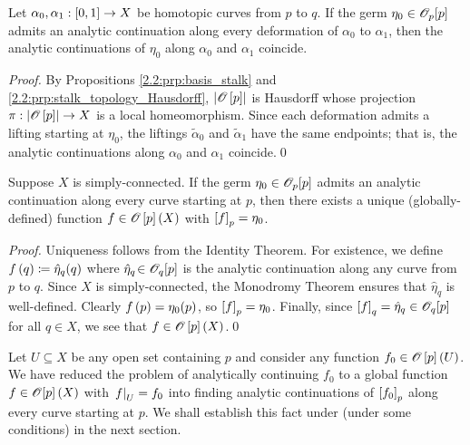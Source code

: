 \documentclass[../Moduli_Spaces_of_Riemann_Surfaces.tex]{subfiles}
\begin{document}
    \begin{corollary}
        Let $\alpha_0,\alpha_1:\left[0,1\right]\to X$ be homotopic curves from $p$ to $q$. If the germ $\eta_0\in\mathscr{O}_p\!\left[p\right]$ admits an analytic continuation along every deformation of $\alpha_0$ to $\alpha_1$, then the analytic continuations of $\eta_0$ along $\alpha_0$ and $\alpha_1$ coincide.
    \end{corollary}
    \begin{proof}
        By Propositions \ref{2.2:prp:basis_stalk} and \ref{2.2:prp:stalk_topology_Hausdorff}, $\left|\mathscr{O}\left[p\right]\right|$ is Hausdorff whose projection $\pi:\left|\mathscr{O}\left[p\right]\right|\to X$ is a local homeomorphism. Since each deformation admits a lifting starting at $\eta_0$, the liftings $\tilde{\alpha}_0$ and $\tilde{\alpha}_1$ have the same endpoints; that is, the analytic continuations along $\alpha_0$ and $\alpha_1$ coincide.\qed
    \end{proof}
    \begin{corollary}\label{2.3:thm:analytically_continue_to_global_function}
        Suppose $X$ is simply-connected. If the germ $\eta_0\in\mathscr{O}_p\!\left[p\right]$ admits an analytic continuation along every curve starting at $p$, then there exists a unique (globally-defined) function $f\in\mathscr{O}\left[p\right]\left(X\right)$ with $\left[f\right]_p=\eta_0$.
    \end{corollary}
    \begin{proof}
        Uniqueness follows from the Identity Theorem. For existence, we define $f\left(q\right)\coloneqq\hat{\eta}_q\!\left(q\right)$ where $\hat{\eta}_q\!\in\mathscr{O}_q\!\left[p\right]$ is the analytic continuation along any curve from $p$ to $q$. Since $X$ is simply-connected, the Monodromy Theorem ensures that $\hat{\eta}_q$ is well-defined. Clearly $f\left(p\right)=\eta_0\!\left(p\right)$, so $\left[f\right]_p=\eta_0$. Finally, since $\left[f\right]_q=\hat{\eta}_q\in\mathscr{O}_q\!\left[p\right]$ for all $q\in X$, we see that $f\in\mathscr{O}\left[p\right]\left(X\right)$.\qed
    \end{proof}
    \begin{remark}
        Let $U\subseteq X$ be any open set containing $p$ and consider any function $f_0\in\mathscr{O}\left[p\right]\left(U\right)$. We have reduced the problem of analytically continuing $f_0$ to a global function $f\in\mathscr{O}[p]\left(X\right)$ with $\left.f\right|_U=f_0$ into finding analytic continuations of $\left[f_0\right]_p$ along every curve starting at $p$. We shall establish this fact under (under some conditions) in the next section.\exqed
    \end{remark}
\end{document}

